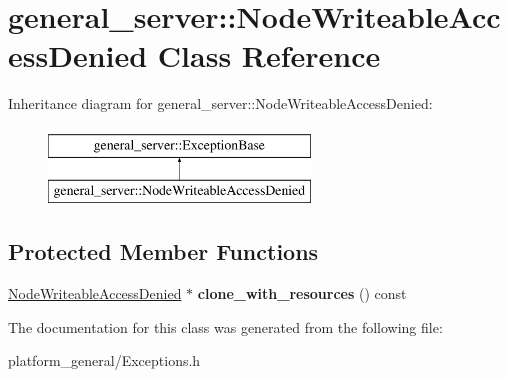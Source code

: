 \hypertarget{classgeneral__server_1_1NodeWriteableAccessDenied}{\section{general\-\_\-server\-:\-:\-Node\-Writeable\-Access\-Denied \-Class \-Reference}
\label{classgeneral__server_1_1NodeWriteableAccessDenied}
}
\-Inheritance diagram for general\-\_\-server\-:\-:\-Node\-Writeable\-Access\-Denied\-:\begin{figure}[H]
\begin{center}
\leavevmode
\includegraphics[height=2.000000cm]{classgeneral__server_1_1NodeWriteableAccessDenied}
\end{center}
\end{figure}
\subsection*{\-Protected \-Member \-Functions}
\begin{DoxyCompactItemize}
\item 
\hypertarget{classgeneral__server_1_1NodeWriteableAccessDenied_a34616c6d4d94764e15576d8bfd73c3c1}{\hyperlink{classgeneral__server_1_1NodeWriteableAccessDenied}{\-Node\-Writeable\-Access\-Denied} $\ast$ {\bfseries clone\-\_\-with\-\_\-resources} () const }\label{classgeneral__server_1_1NodeWriteableAccessDenied_a34616c6d4d94764e15576d8bfd73c3c1}

\end{DoxyCompactItemize}


\-The documentation for this class was generated from the following file\-:\begin{DoxyCompactItemize}
\item 
platform\-\_\-general/\-Exceptions.\-h\end{DoxyCompactItemize}
